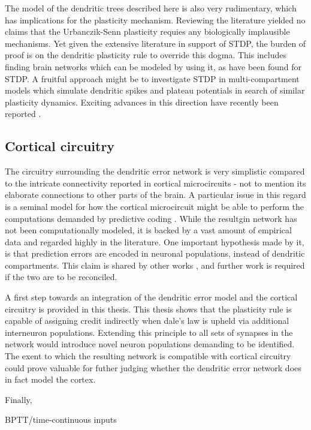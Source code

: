 The model of the dendritic trees described here is also very rudimentary, which has implications for the plasticity
mechanism. Reviewing the literature yielded no claims that the Urbanczik-Senn plasticity requies any biologically
implausible mechanisms. Yet given the extensive literature in support of STDP, the burden of proof is on the dendritic
plasticity rule to override this dogma. This includes finding brain networks which can be modeled by using it, as have
been found for STDP. A fruitful approach might be to investigate STDP in multi-compartment models which simulate
dendritic spikes and plateau potentials in search of similar plasticity dynamics. Exciting advances in this direction
have recently been reported \citep{Bono2017,Schiess2016,magee2020synaptic}.

\subsection*{Cortical circuitry}

The circuitry surrounding the dendritic error network is very simplistic compared to the intricate connectivity reported
in cortical microcircuits - not to mention its elaborate connections to other parts of the brain. A particular issue in
this regard is a seminal model for how the cortical microcircuit might be able to perform the computations demanded by
predictive coding \citep{bastos2012canonical}. While the resultgin network has not been computationally modeled, it is
backed by a vast amount of empirical data and regarded highly in the literature. One important hypothesis made by it, is
that prediction errors are encoded in neuronal populations, instead of dendritic compartments. This claim is shared by
other works \citep{Hertaeg2022}, and further work is required if the two are to be reconciled.

A first step towards an integration of the dendritic error model and the cortical circuitry is provided in this thesis.
This thesis shows that the plasticity rule is capable of assigning credit indirectly when dale's law is upheld via
additional interneuron populations. Extending this principle to all sets of synapses in the network would introduce
novel neuron populations demanding to be identified. The exent to which the resulting network is compatible with
cortical circuitry could prove valuable for futher judging whether the dendritic error network does in fact model the
cortex.

Finally,


BPTT/time-continuous inputs



